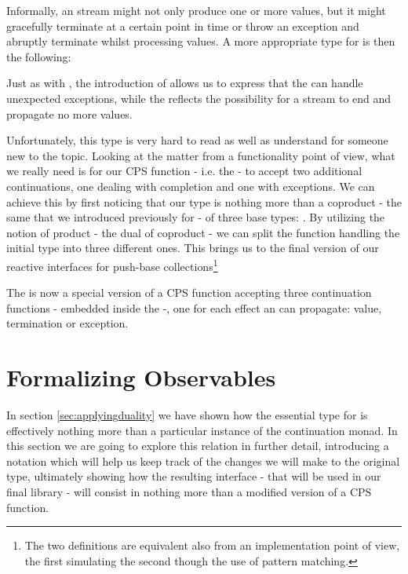Informally, an  stream might not only produce one or more values, but it might gracefully terminate at a certain point in time or throw an exception and abruptly terminate whilst processing values. A more appropriate type for  is then the following:


Just as with , the introduction of  allows us to express that the  can handle unexpected exceptions, while the  reflects the possibility for a stream to end and propagate no more values. 

Unfortunately, this type is very hard to read as well as understand for someone new to the topic. Looking at the matter from a functionality point of view, what we really need is for our CPS function - i.e. the  - to accept two additional continuations, one dealing with completion and one with exceptions. We can achieve this by first noticing that our type is nothing more than a coproduct - the same that we introduced previously for  - of three base types: . By utilizing the notion of product - the dual of coproduct - we can split the function handling the initial type into three different ones. This brings us to the final version of our reactive interfaces for push-base collections\footnote{The two definitions are equivalent also from an implementation point of view, the first simulating the second though the use of pattern matching.}


The  is now a special version of a CPS function accepting three continuation functions - embedded inside the  -, one for each effect an  can propagate: value, termination or exception.

\section{Formalizing Observables}
\label{obscont}

In section \ref{sec:applyingduality} we have shown how the essential type for  is effectively nothing more than a particular instance of the continuation monad. In this section we are going to explore this relation in further detail, introducing a notation which will help us keep track of the changes we will make to the original type, ultimately showing how the resulting interface - that will be used in our final library - will consist in nothing more than a modified version of a CPS function.

